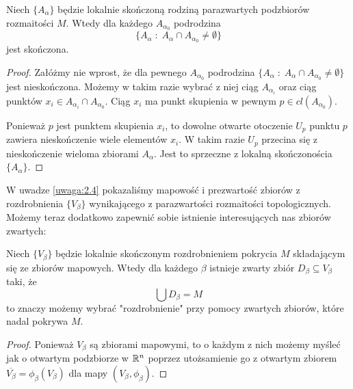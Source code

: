 \begin{remark}
  Niech $\{A_\alpha\}$ będzie lokalnie skończoną rodziną parazwartych podzbiorów rozmaitości $M$. Wtedy dla każdego $A_{\alpha_0}$ podrodzina
  $$\{A_\alpha\;:\;A_\alpha\cap A_{\alpha_0}\neq\emptyset\}$$
  jest skończona.
\end{remark}

\begin{proof}
  Załóżmy nie wprost, że dla pewnego $A_{\alpha_0}$ podrodzina $\{A_\alpha\;:\;A_\alpha\cap A_{\alpha_0}\neq\emptyset\}$ jest nieskończona. Możemy w takim razie wybrać z niej ciąg $A_{\alpha_i}$ oraz ciąg punktów $x_i\in A_{\alpha_i}\cap A_{\alpha_0}$. Ciąg $x_i$ ma punkt skupienia w pewnym $p\in cl(A_{\alpha_0})$. 

  Ponieważ $p$ jest punktem skupienia $x_i$, to dowolne otwarte otoczenie $U_p$ punktu $p$ zawiera nieskończenie wiele elementów $x_i$. W takim razie $U_p$ przecina się z nieskończenie wieloma zbiorami $A_\alpha$. Jest to sprzeczne z lokalną skończonościa $\{A_\alpha\}$.
\end{proof}

W uwadze \ref{uwaga:2.4} pokazaliśmy mapowość i prezwartość zbiorów z rozdrobnienia $\{V_\beta\}$ wynikającego z parazwartości rozmaitości topologicznych. Możemy teraz dodatkowo zapewnić sobie istnienie interesujących nas zbiorów zwartych:

\begin{remark}
  Niech $\{V_\beta\}$ będzie lokalnie skończonym rozdrobnieniem pokrycia $M$ składającym się ze zbiorów mapowych. Wtedy dla każdego $\beta$ istnieje zwarty zbiór $D_\beta\subseteq V_\beta$ taki, że
  $$\bigcup D_\beta=M$$
  to znaczy możemy wybrać "rozdrobnienie" przy pomocy zwartych zbiorów, które nadal pokrywa $M$.
\end{remark}

\begin{proof}
  Ponieważ $V_\beta$ są zbiorami mapowymi, to o każdym z nich możemy myśleć jak o otwartym podzbiorze w $\mathbb{R}^n$ poprzez utożsamienie go z otwartym zbiorem $\overline{V_\beta}=\phi_\beta(V_\beta)$ dla mapy $(V_\beta, \phi_\beta)$.
\end{proof}
